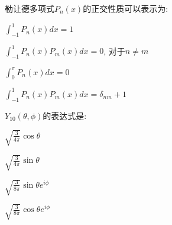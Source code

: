 \documentclass{njustexam}
\begin{document}

\begin{problem}
  勒让德多项式$P_n(x)$的正交性质可以表示为:
  \begin{abcd}
    \item $\int_{-1}^{1} P_n(x) dx = 1$

    \item $\int_{-1}^{1} P_n(x) P_m(x) dx = 0$, 对于$n \neq m$
    
    \item $\int_{0}^{\pi} P_n(x) dx = 0$
    
    \item $\int_{-1}^{1} P_n(x) P_m(x) dx = \delta_{nm} + 1$
  \end{abcd}
\end{problem}

\begin{problem}
  $Y_{10}(\theta,  \phi)$的表达式是:
\begin{abcd}
  \item $\sqrt{\frac{3}{4\pi}} \cos \theta$
  \item $\sqrt{\frac{3}{4\pi}} \sin \theta$
  \item $\sqrt{\frac{3}{8\pi}} \sin \theta e^{i\phi}$
  \item $\sqrt{\frac{3}{8\pi}} \cos \theta e^{i\phi}$
\end{abcd}
\end{problem}

\end{document}
